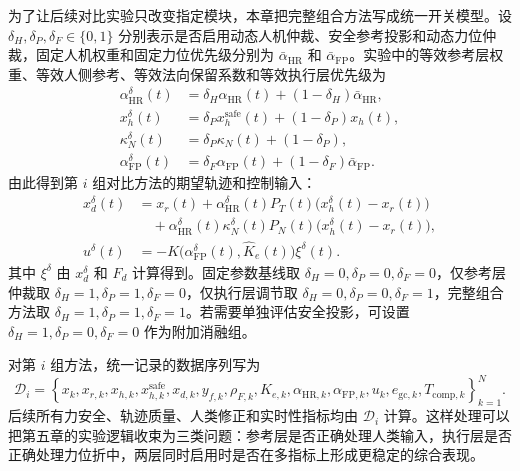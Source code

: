为了让后续对比实验只改变指定模块，本章把完整组合方法写成统一开关模型。设 $\delta_H,\delta_P,\delta_F\in\{0,1\}$ 分别表示是否启用动态人机仲裁、安全参考投影和动态力位仲裁，固定人机权重和固定力位优先级分别为 $\bar\alpha_{\mathrm{HR}}$ 和 $\bar\alpha_{\mathrm{FP}}$。实验中的等效参考层权重、等效人侧参考、等效法向保留系数和等效执行层优先级为
\begin{equation}
  \begin{aligned}
  \alpha_{\mathrm{HR}}^{\delta}(t)
  &=
  \delta_H\alpha_{\mathrm{HR}}(t)
  +(1-\delta_H)\bar\alpha_{\mathrm{HR}},\\
  x_h^{\delta}(t)
  &=
  \delta_P x_h^{\mathrm{safe}}(t)
  +(1-\delta_P)x_h(t),\\
  \kappa_N^{\delta}(t)
  &=
  \delta_P\kappa_N(t)
  +(1-\delta_P),\\
  \alpha_{\mathrm{FP}}^{\delta}(t)
  &=
  \delta_F\alpha_{\mathrm{FP}}(t)
  +(1-\delta_F)\bar\alpha_{\mathrm{FP}}.
  \end{aligned}
  \label{eq:ch5_switch_variables}
\end{equation}
由此得到第 $i$ 组对比方法的期望轨迹和控制输入：
\begin{equation}
  \begin{aligned}
  x_d^{\delta}(t)
  &=
  x_r(t)+
  \alpha_{\mathrm{HR}}^{\delta}(t)P_T(t)
  \bigl(x_h^{\delta}(t)-x_r(t)\bigr)\\
  &\quad+
  \alpha_{\mathrm{HR}}^{\delta}(t)\kappa_N^{\delta}(t)P_N(t)
  \bigl(x_h^{\delta}(t)-x_r(t)\bigr),\\
  u^{\delta}(t)
  &=
  -K\bigl(\alpha_{\mathrm{FP}}^{\delta}(t),\hat K_e(t)\bigr)
  \xi^{\delta}(t).
  \end{aligned}
  \label{eq:ch5_switched_closed_loop}
\end{equation}
其中 $\xi^{\delta}$ 由 $x_d^{\delta}$ 和 $F_d$ 计算得到。固定参数基线取 $\delta_H=0,\delta_P=0,\delta_F=0$，仅参考层仲裁取 $\delta_H=1,\delta_P=1,\delta_F=0$，仅执行层调节取 $\delta_H=0,\delta_P=0,\delta_F=1$，完整组合方法取 $\delta_H=1,\delta_P=1,\delta_F=1$。若需要单独评估安全投影，可设置 $\delta_H=1,\delta_P=0,\delta_F=0$ 作为附加消融组。

对第 $i$ 组方法，统一记录的数据序列写为
\begin{equation}
  \mathcal D_i=
  \left\{
  x_k,x_{r,k},x_{h,k},x_{h,k}^{\mathrm{safe}},x_{d,k},
  y_{f,k},\rho_{F,k},\hat K_{e,k},
  \alpha_{\mathrm{HR},k},\alpha_{\mathrm{FP},k},
  u_k,e_{\mathrm{gc},k},T_{\mathrm{comp},k}
  \right\}_{k=1}^{N}.
  \label{eq:ch5_experiment_dataset}
\end{equation}
后续所有力安全、轨迹质量、人类修正和实时性指标均由 $\mathcal D_i$ 计算。这样处理可以把第五章的实验逻辑收束为三类问题：参考层是否正确处理人类输入，执行层是否正确处理力位折中，两层同时启用时是否在多指标上形成更稳定的综合表现。

